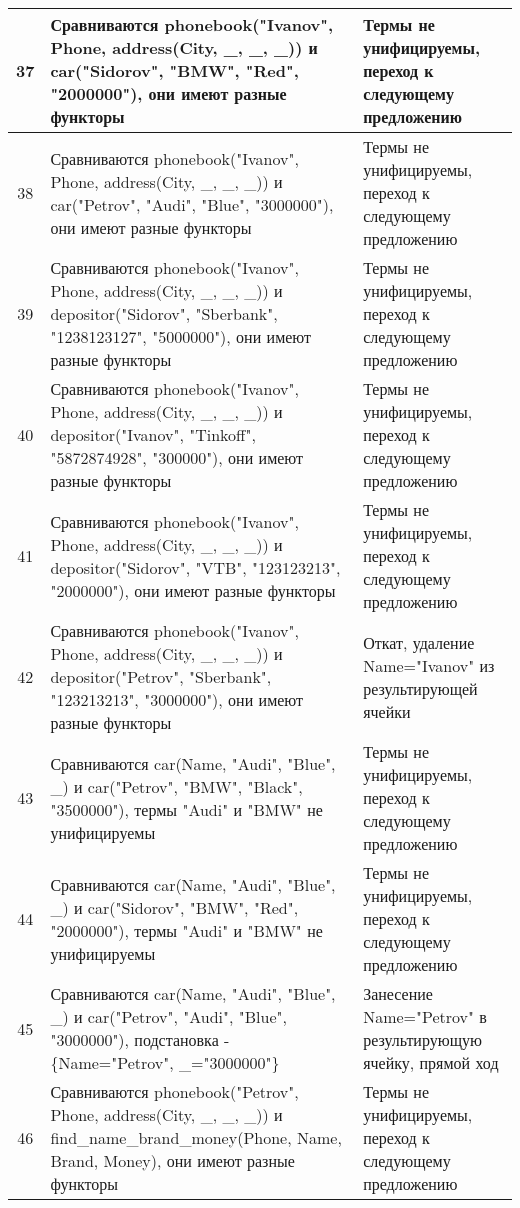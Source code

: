 \documentclass[a4paper,12pt]{article}
\begin{document}
\newpage
\begin{table}[ht!] 
	\begin{tabularx}{\linewidth}{|c|>{\centering}X|>{\centering}X|}
		\hline
		37 & Сравниваются phonebook("Ivanov"{}, Phone, address(City, \_, \_, \_)) и car("Sidorov"{}, "BMW"{}, "Red"{}, "2000000"), они имеют разные функторы & Термы не унифицируемы, переход к следующему предложению \tabularnewline
		\hline
		38 & Сравниваются phonebook("Ivanov"{}, Phone, address(City, \_, \_, \_)) и car("Petrov"{}, "Audi"{}, "Blue"{}, "3000000"), они имеют разные функторы & Термы не унифицируемы, переход к следующему предложению \tabularnewline
		\hline
		39 & Сравниваются phonebook("Ivanov"{}, Phone, address(City, \_, \_, \_)) и depositor("Sidorov"{}, "Sberbank"{}, "1238123127"{}, "5000000"), они имеют разные функторы & Термы не унифицируемы, переход к следующему предложению \tabularnewline
		\hline
		40 & Сравниваются phonebook("Ivanov"{}, Phone, address(City, \_, \_, \_)) и depositor("Ivanov"{}, "Tinkoff"{}, "5872874928"{}, "300000"), они имеют разные функторы & Термы не унифицируемы, переход к следующему предложению \tabularnewline
		\hline
		41 & Сравниваются phonebook("Ivanov"{}, Phone, address(City, \_, \_, \_)) и depositor("Sidorov"{}, "VTB"{}, "123123213"{}, "2000000"), они имеют разные функторы & Термы не унифицируемы, переход к следующему предложению \tabularnewline
		\hline
		42 & Сравниваются phonebook("Ivanov"{}, Phone, address(City, \_, \_, \_)) и depositor("Petrov"{}, "Sberbank"{}, "123213213"{}, "3000000"), они имеют разные функторы & Откат, удаление Name="Ivanov" из результирующей ячейки \tabularnewline
		\hline
		43 & Сравниваются car(Name, "Audi"{}, "Blue"{}, \_) и car("Petrov"{}, "BMW"{}, "Black"{}, "3500000"), термы "Audi" и "BMW" не унифицируемы & Термы не унифицируемы, переход к следующему предложению \tabularnewline
		\hline
		44 & Сравниваются car(Name, "Audi"{}, "Blue"{}, \_) и car("Sidorov"{}, "BMW"{}, "Red"{}, "2000000"),  термы "Audi" и "BMW" не унифицируемы & Термы не унифицируемы, переход к следующему предложению \tabularnewline
		\hline
		45 & Сравниваются car(Name, "Audi"{}, "Blue"{}, \_) и car("Petrov"{}, "Audi"{}, "Blue"{}, "3000000"), подстановка - \{Name="Petrov"{}, \_="3000000"\} & Занесение Name="Petrov" в результирующую ячейку, прямой ход \tabularnewline
		\hline
		46 & Сравниваются phonebook("Petrov"{}, Phone, address(City, \_, \_, \_)) и find\_name\_brand\_money(Phone, Name, Brand, Money), они имеют разные функторы & Термы не унифицируемы, переход к следующему предложению \tabularnewline
		\hline
	\end{tabularx}
\end{table}
\end{document}
